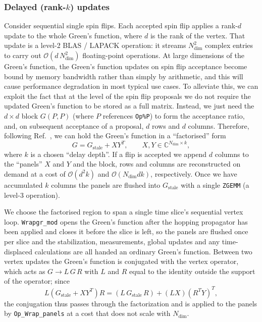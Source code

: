 \subsubsection{Delayed (rank-$k$) updates}
\label{sec:delayed}
%
Consider sequential single spin flips. Each accepted spin flip applies a
rank-$d$ update to the whole Green's function, where $d$ is the rank of the
vertex. That update is a level-2 BLAS / LAPACK operation: it streams
$N_{\text{dim}}^2$ complex entries to carry out
$\mathcal{O}(d \, N_{\text{dim}}^2)$ floating-point operations. At large
dimensions of the Green's function, the Green's function updates on spin flip
acceptance become bound by memory bandwidth rather than simply by arithmetic,
and this will cause performance degradation in most typical use cases. To
alleviate this, we can exploit the fact that at the level of the spin flip
proposals we do not require the updated Green's function to be stored as a
full matrix. Instead, we just need the $d \times d$ block $G(P,P)$
(where $P$ references \texttt{Op\%P}) to form the acceptance ratio,
and, on subsequent acceptance of a proposal, $d$ rows and $d$ columns.
Therefore, following Ref.~\cite{Sun2024}, we can hold the Green's function in a
``factorised'' form
\begin{equation}
  G = G_{\text{stale}} + X Y^{T},
  \qquad X, Y \in \mathbb{C}^{N_{\text{dim}} \times k},
\end{equation}
where $k$ is a chosen ``delay depth''.
If a flip is accepted we append $d$ columns to the ``panels'' $X$ and $Y$
and the block, rows and columns are reconstructed
on demand at a cost of $\mathcal{O}(d^2 k)$ and
$\mathcal{O}(N_{\text{dim}} d k)$, respectively. Once we have accumulated $k$
columns
the panels are flushed into
$G_{\text{stale}}$ with a single \texttt{ZGEMM} (a level-3 operation).

We choose the factorised region to span a single time slice's sequential
vertex loop. \texttt{Wrapgr\_mod} opens the Green's function after the hopping
propagator has been
applied and closes it before the slice is left, so the panels are flushed once
per slice and the stabilization, measurements, global updates and any
time-displaced calculations are all handed an ordinary Green's function. Between
two vertex updates the Green's function is conjugated with the vertex operator,
which acts as $G \rightarrow L \, G \, R$ with $L$ and $R$ equal to the identity
outside the support of the operator; since
\begin{equation}
  L \left( G_{\text{stale}} + X Y^{T} \right) R
  = \left( L \, G_{\text{stale}} \, R \right)
  + \left( L X \right) \left( R^{T} Y \right)^{T},
\end{equation}
the conjugation thus passes through the factorization and is applied
to the panels by \texttt{Op\_Wrap\_panels} at a cost that does not scale with
$N_{\text{dim}}$.

